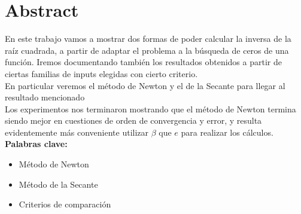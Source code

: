 \section{Abstract}

En este trabajo vamos a mostrar dos formas de poder
calcular la inversa de la raíz cuadrada, a partir de adaptar el problema a la
búsqueda de ceros de una función. Iremos documentando también los resultados
obtenidos a partir de ciertas familias de inputs elegidas con cierto
criterio.\\

En particular veremos el método de Newton y el de la Secante para llegar al
resultado mencionado\\

Los experimentos nos terminaron mostrando que el método de Newton termina
siendo mejor en cuestiones de orden de convergencia y error, y resulta evidentemente más conveniente utilizar $\beta$
que $e$ para realizar los cálculos.\\

{\bf Palabras clave:}
\begin{itemize} 
    \item Método de Newton 
    \item Método de la Secante 
    \item Criterios de comparación 
\end{itemize}
